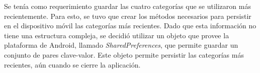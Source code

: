 \begin{itemize}
Se tenía como requerimiento guardar las cuatro categorías que se utilizaron más recientemente. Para esto, se tuvo que crear los métodos necesarios para persistir en el dispositivo móvil las categorías más recientes. Dado que esta información no tiene una estructura compleja, se decidió utilizar un objeto que provee la plataforma de Android, llamado \textit{SharedPreferences}, que permite guardar un conjunto de pares clave-valor. Este objeto permite persistir las categorías más recientes, aún cuando se cierre la aplicación.

\end{itemize}

%
%
%
%
%
%
%

